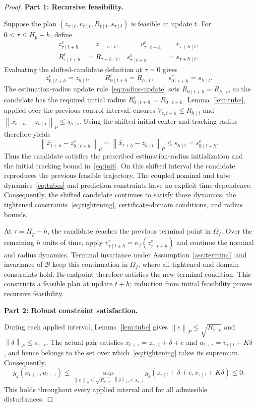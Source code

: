 \documentclass[11pt,a4paper]{article}
\numberwithin{equation}{section}
\theoremstyle{remark}\newtheorem{remark}{Remark}
\newcommand{\norm}[1]{\left\lVert#1\right\rVert}
\begin{document}
\begin{proof}
\leavevmode\par\smallskip\noindent\textbf{Part 1: Recursive feasibility.}\par\nobreak\smallskip\noindent
Suppose the plan $(z_{\tau\mid t},v_{\tau\mid t},R_{\tau\mid t},s_{\tau\mid t})$ is feasible at update $t$. For $0\le\tau\le H_p-h$, define
\[
\begin{aligned}
z^c_{\tau\mid t+h}&=z_{\tau+h\mid t}, &\qquad v^c_{\tau\mid t+h}&=v_{\tau+h\mid t},\\
R^c_{\tau\mid t+h}&=R_{\tau+h\mid t}, & s^c_{\tau\mid t+h}&=s_{\tau+h\mid t}.
\end{aligned}
\]
Evaluating the shifted-candidate definition at $\tau=0$ gives
\[
z^c_{0\mid t+h}=z_{h\mid t},\qquad
R^c_{0\mid t+h}=R_{h\mid t},\qquad
s^c_{0\mid t+h}=s_{h\mid t}.
\]
The estimation-radius update rule~\eqref{eq:radius-update} sets $R_{0\mid t+h}=R_{h\mid t}$, so the candidate has the required initial radius $R^c_{0\mid t+h}=R_{0\mid t+h}$. Lemma~\ref{lem:tube}, applied over the previous control interval, ensures $V_{e,t+h}\le R_{h\mid t}$ and $\norm{\hat x_{t+h}-z_{h\mid t}}_P\le s_{h\mid t}$.
Using the shifted initial center and tracking radius therefore yields
\[
\norm{\hat x_{t+h}-z^c_{0\mid t+h}}_P
=\norm{\hat x_{t+h}-z_{h\mid t}}_P
\le s_{h\mid t}=s^c_{0\mid t+h}.
\]
Thus the candidate satisfies the prescribed estimation-radius initialization and the initial tracking bound in~\eqref{eq:init}. On this shifted interval the candidate reproduces the previous feasible trajectory. The coupled nominal and tube dynamics~\eqref{eq:tubes} and prediction constraints have no explicit time dependence. Consequently, the shifted candidate continues to satisfy those dynamics, the tightened constraints~\eqref{eq:tightening}, certificate-domain conditions, and radius bounds.

At $\tau=H_p-h$, the candidate reaches the previous terminal point in $\Omega_f$. Over the remaining $h$ units of time, apply $v^c_{\tau\mid t+h}=\kappa_f(z^c_{\tau\mid t+h})$ and continue the nominal and radius dynamics. Terminal invariance under Assumption~\ref{ass:terminal} and invariance of $\mathcal B$ keep this continuation in $\Omega_f$, where all tightened and domain constraints hold. Its endpoint therefore satisfies the new terminal condition. This constructs a feasible plan at update $t+h$; induction from initial feasibility proves recursive feasibility.

\par\medskip\noindent\textbf{Part 2: Robust constraint satisfaction.}\par\nobreak\smallskip\noindent
During each applied interval, Lemma~\ref{lem:tube} gives $\norm e_P\le\sqrt{R_{\tau\mid t}}$ and $\norm\delta_P\le s_{\tau\mid t}$. The actual pair satisfies $x_{t+\tau}=z_{\tau\mid t}+\delta+e$ and $u_{t+\tau}=v_{\tau\mid t}+K\delta$, and hence belongs to the set over which~\eqref{eq:tightening} takes its supremum. Consequently,
\[
g_j(x_{t+\tau},u_{t+\tau})\le
\sup_{\norm e_P\le\sqrt{R_{\tau\mid t}},\ \norm\delta_P\le s_{\tau\mid t}}
g_j(z_{\tau\mid t}+\delta+e,v_{\tau\mid t}+K\delta)\le0.
\]
This holds throughout every applied interval and for all admissible disturbances.


\end{proof}
\end{document}
